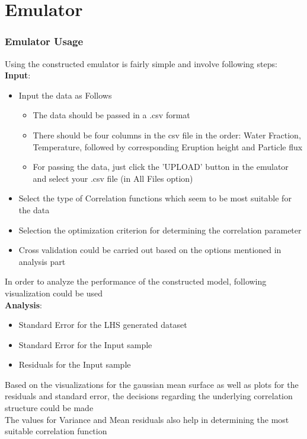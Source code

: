 \documentclass[10pt]{beamer}
\begin{document}
\section{Emulator}
\begin{frame}
\frametitle{Emulator Usage}
Using the constructed emulator is fairly simple and involve following steps:\\

{\bf Input}:
\begin{itemize}
    \item Input the data as Follows
    \begin{itemize}
        \item The data should be passed in a .csv format
        \item There should be four columns in the csv file in the order: Water Fraction, Temperature, followed by corresponding Eruption height and Particle flux
        \item For passing the data, just click the 'UPLOAD' button in the emulator and select your .csv file (in All Files option)
   \end{itemize}
    \item Select the type of Correlation functions which seem to be most suitable for the data
    \item Selection the optimization criterion for determining the correlation parameter
    \item Cross validation could be carried out based on the options mentioned in analysis part
\end{itemize}

\end{frame}
\begin{frame}
In order to analyze the performance of the constructed model, following visualization could be used \\
\vspace{4mm}
{\bf Analysis}:
\begin{itemize}
    \item Standard Error for the LHS generated dataset
    \item Standard Error for the Input sample
    \item Residuals for the Input sample
\end{itemize}
\vspace{4mm}
Based on the visualizations for the gaussian mean surface as well as plots for the residuals and standard error, the decisions regarding the underlying correlation structure could be made\\
\vspace{2mm}
The values for Variance and Mean residuals also help in determining the most suitable correlation function 
\end{frame}
\end{document}
